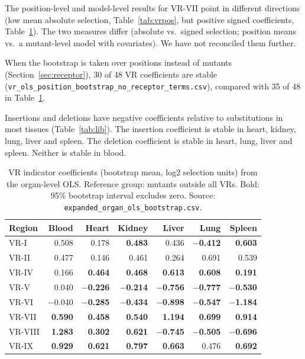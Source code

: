\documentclass[11pt]{article}
\begin{document}
The position-level and model-level results for VR-VII point in different directions (low mean
absolute selection, Table~\ref{tab:vrpos}, but positive signed coefficients, Table~\ref{tab:vrorgan}).
The two measures differ (absolute vs.\ signed selection; position means vs.\ a mutant-level model
with covariates). We have not reconciled them further.

When the bootstrap is taken over positions instead of mutants (Section~\ref{sec:receptor}), 30 of 48 VR coefficients are stable
(\texttt{vr\_ols\_position\_bootstrap\_no\_receptor\_terms.csv}), compared with 35 of 48 in Table~\ref{tab:vrorgan}.

Insertions and deletions have negative coefficients relative to substitutions in most tissues
(Table~\ref{tab:lib}). The insertion coefficient is stable in heart, kidney, lung, liver and
spleen. The deletion coefficient is stable in heart, lung, liver and spleen. Neither is stable in
blood.

\begin{table}[H]
\centering
\caption{VR indicator coefficients (bootstrap mean, log2 selection units) from the organ-level
OLS. Reference group: mutants outside all VRs. Bold: 95\% bootstrap interval excludes zero.
Source: \texttt{expanded\_organ\_ols\_bootstrap.csv}.}
\label{tab:vrorgan}
\small
\begin{tabular}{lrrrrrr}
\toprule
Region & Blood & Heart & Kidney & Liver & Lung & Spleen \\
\midrule
VR-I & 0.508 & 0.178 & \textbf{0.483} & 0.436 & \textbf{$-$0.412} & \textbf{0.603} \\
VR-II & 0.477 & 0.146 & 0.461 & 0.264 & 0.691 & 0.539 \\
VR-IV & 0.166 & \textbf{0.464} & \textbf{0.468} & \textbf{0.613} & \textbf{0.608} & \textbf{0.191} \\
VR-V & 0.040 & \textbf{$-$0.226} & \textbf{$-$0.214} & \textbf{$-$0.756} & \textbf{$-$0.777} & \textbf{$-$0.530} \\
VR-VI & $-$0.040 & \textbf{$-$0.285} & \textbf{$-$0.434} & \textbf{$-$0.898} & \textbf{$-$0.547} & \textbf{$-$1.184} \\
VR-VII & \textbf{0.590} & \textbf{0.458} & \textbf{0.540} & \textbf{1.194} & \textbf{0.699} & \textbf{0.914} \\
VR-VIII & \textbf{1.283} & \textbf{0.302} & \textbf{0.621} & \textbf{$-$0.745} & \textbf{$-$0.505} & \textbf{$-$0.696} \\
VR-IX & \textbf{0.929} & \textbf{0.621} & \textbf{0.797} & \textbf{0.663} & 0.476 & \textbf{0.692} \\
\bottomrule
\end{tabular}
\end{table}
\end{document}
